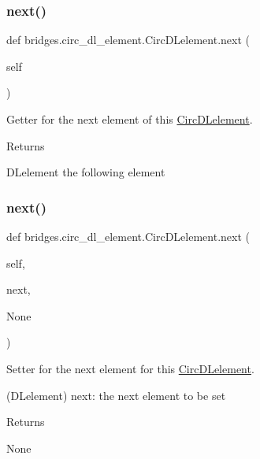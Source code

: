 \subsubsection{\texorpdfstring{next()}{next()}\hspace{0.1cm}{\footnotesize\ttfamily [1/2]}}
{\footnotesize\ttfamily def bridges.\+circ\+\_\+dl\+\_\+element.\+Circ\+D\+Lelement.\+next (\begin{DoxyParamCaption}\item[{}]{self }\end{DoxyParamCaption})}



Getter for the next element of this \hyperlink{classbridges_1_1circ__dl__element_1_1_circ_d_lelement}{Circ\+D\+Lelement}. 

\begin{DoxyReturn}{Returns}


D\+Lelement the following element 
\end{DoxyReturn}
\mbox{\label{classbridges_1_1circ__dl__element_1_1_circ_d_lelement_a842efa9c0ad878fe34b343600a23d9aa}} 
\subsubsection{\texorpdfstring{next()}{next()}\hspace{0.1cm}{\footnotesize\ttfamily [2/2]}}
{\footnotesize\ttfamily def bridges.\+circ\+\_\+dl\+\_\+element.\+Circ\+D\+Lelement.\+next (\begin{DoxyParamCaption}\item[{}]{self,  }\item[{}]{next,  }\item[{}]{None }\end{DoxyParamCaption})}



Setter for the next element for this \hyperlink{classbridges_1_1circ__dl__element_1_1_circ_d_lelement}{Circ\+D\+Lelement}. 

(D\+Lelement) next\+: the next element to be set \begin{DoxyReturn}{Returns}


None 
\end{DoxyReturn}
\mbox{\label{classbridges_1_1circ__dl__element_1_1_circ_d_lelement_aa2ebe17f407680a6a4fc886ef9516d61}} 
